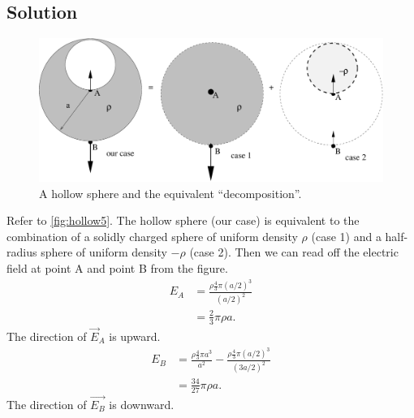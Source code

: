 \documentclass[solutions]{esg8022pset}
\begin{document}
\subsection{Solution}
  \begin{figure}[ht]
    \begin{center}
      \includegraphics[width=12cm]{ps02_sol_01}
      \caption{A hollow sphere and the equivalent ``decomposition''.}
      \label{fig:hollow5}
    \end{center}
  \end{figure}

  Refer to \autoref{fig:hollow5}.  The hollow sphere (our case) is equivalent to the combination of a solidly charged sphere of uniform density $\rho$ (case 1) and a half-radius sphere of uniform density $-\rho$ (case 2).  Then we can read off the electric field at point A and point B from the figure.
  \begin{align*}
  E_A & = \frac{\rho \frac{4}{3}\pi(a/2)^3}{(a/2)^2} \\
      & = \frac{2}{3}\pi\rho a.
  \end{align*}
  The direction of $\vec E_A$ is upward.
  \begin{align*}
  E_B & = \frac{\rho \frac{4}{3}\pi a^3}{a^2}-\frac{\rho \frac{4}{3}\pi(a/2)^3}{(3a/2)^2} \\
      & = \frac{34}{27}\pi\rho a.
  \end{align*}
  The direction of $\vec{E_B}$ is downward.
\end{document}
